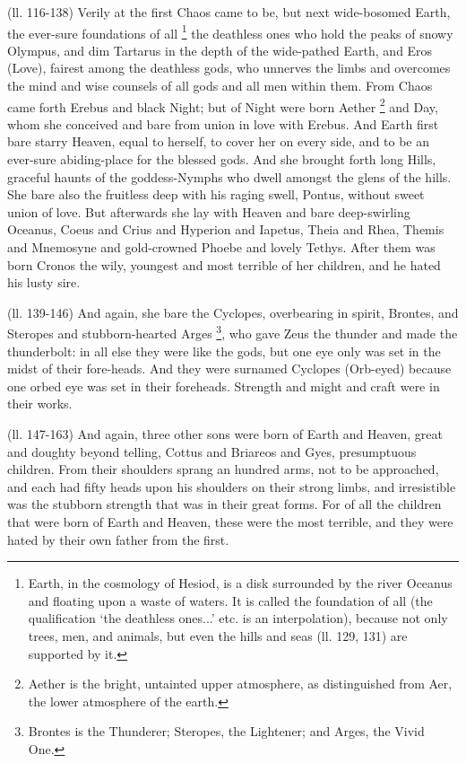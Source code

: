 (ll. 116-138) Verily at the first Chaos came to be, but next wide-bosomed
Earth, the ever-sure foundations of all \footnote{Earth, in the cosmology of
Hesiod, is a disk surrounded by the river Oceanus and floating upon a waste of
waters. It is called the foundation of all (the qualification ‘the
deathless ones...’ etc. is an interpolation), because not only trees,
men, and animals, but even the hills and seas (ll. 129, 131) are supported by
it.} the
deathless ones who hold the peaks of snowy Olympus, and dim Tartarus in the
depth of the wide-pathed Earth, and Eros (Love), fairest among the deathless
gods, who unnerves the limbs and overcomes the mind and wise counsels of all
gods and all men within them. From Chaos came forth Erebus and black Night; but
of Night were born Aether \footnote{Aether is the bright,
untainted upper atmosphere, as distinguished from Aer, the lower atmosphere of
the earth.} and Day, whom she conceived and
bare from union in love with Erebus. And Earth first bare starry Heaven, equal
to herself, to cover her on every side, and to be an ever-sure abiding-place
for the blessed gods. And she brought forth long Hills, graceful haunts of the
goddess-Nymphs who dwell amongst the glens of the hills. She bare also the
fruitless deep with his raging swell, Pontus, without sweet union of love. But
afterwards she lay with Heaven and bare deep-swirling Oceanus, Coeus and Crius
and Hyperion and Iapetus, Theia and Rhea, Themis and Mnemosyne and gold-crowned
Phoebe and lovely Tethys. After them was born Cronos the wily, youngest and
most terrible of her children, and he hated his lusty sire.

(ll. 139-146) And again, she bare the Cyclopes, overbearing in spirit, Brontes,
and Steropes and stubborn-hearted Arges \footnote{Brontes is the Thunderer;
Steropes, the Lightener; and Arges, the Vivid One.}, who gave
Zeus the thunder and made the thunderbolt: in all else they were like the gods,
but one eye only was set in the midst of their fore-heads. And they were
surnamed Cyclopes (Orb-eyed) because one orbed eye was set in their foreheads.
Strength and might and craft were in their works.

(ll. 147-163) And again, three other sons were born of Earth and Heaven, great
and doughty beyond telling, Cottus and Briareos and Gyes, presumptuous
children. From their shoulders sprang an hundred arms, not to be approached,
and each had fifty heads upon his shoulders on their strong limbs, and
irresistible was the stubborn strength that was in their great forms. For of
all the children that were born of Earth and Heaven, these were the most
terrible, and they were hated by their own father from the first.

